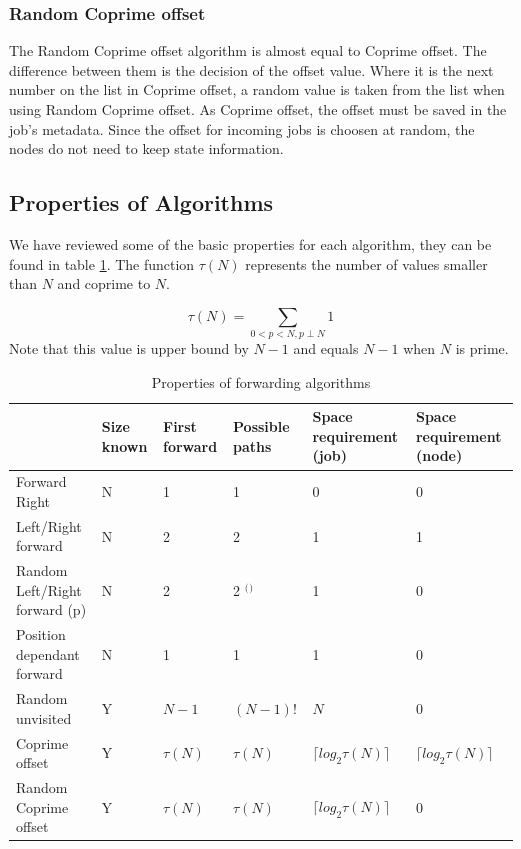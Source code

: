 \documentclass[10pt,a4paper]{article}
\begin{document}
\subsubsection*{Random Coprime offset}
The Random Coprime offset algorithm is almost equal to Coprime offset. The difference between them is the decision of the offset value. Where it is the next number on the list in Coprime offset, a random value is taken from the list when using Random Coprime offset. As Coprime offset, the offset must be saved in the job's metadata. Since the offset for incoming jobs is choosen at random, the nodes do not need to keep state information.

\subsection{Properties of Algorithms}
\label{secprops}

We have reviewed some of the basic properties for each algorithm, they can be found in table \ref{tabprops}. The function $\tau(N)$ represents the number of values smaller than $N$ and coprime to $N$.

\[ \tau(N) = \sum_{0 < p < N, p \perp N} 1\]
Note that this value is upper bound by $N-1$ and equals $N-1$ when $N$ is prime.

\begin{table}[h!]
\hspace{-0.12\textwidth}
\begin{tabular}{|p{}|p{}|p{}|p{}|p{}|p{}|} \cline{2-6}
\multicolumn{1}{l|}{}		& Size known	& First forward	& Possible paths	& Space requirement (job)	& Space requirement (node) \\ \hline
Forward Right				& N				& 1				& 1					& 0							& 0		\\ \hline
Left/Right forward			& N				& 2				& 2					& 1							& 1		\\ \hline
Random Left/Right forward (p) & N			& 2				& 2 $^($\footnotemark$^)$ & 1					& 0		\\ \hline
Position dependant forward	& N				& 1				& 1					& 1							& 0		\\ \hline
Random unvisited			& Y				& $N-1$			& $(N-1)!$			& $N$	& 0		\\ \hline
Coprime offset				& Y				& $\tau(N)$		& $\tau(N)$ 		& $\lceil log_2 \tau(N) \rceil$	& $\lceil log_2 \tau(N) \rceil$ \\ \hline
Random Coprime offset		& Y				& $\tau(N)$		& $\tau(N)$			& $\lceil log_2 \tau(N) \rceil$	& 0		\\ \hline
\end{tabular}
\caption{Properties of forwarding algorithms}
\label{tabprops}
\end{table}
\end{document}

